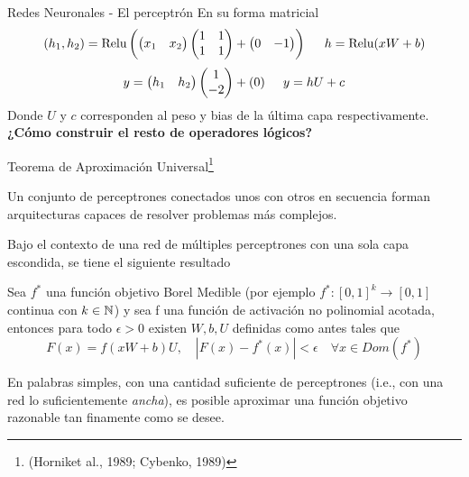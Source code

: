 \documentclass[handout, 9pt]{beamer}
\begin{document}
\begin{frame}{Redes Neuronales - El perceptrón}
En su forma matricial 
$$
(h_1 , h_2) = \text{Relu} \left ( \begin{pmatrix}
x_1 & x_2  
\end{pmatrix} \begin{pmatrix}
1 &1 \\ 
 1 & 1
\end{pmatrix} + \begin{pmatrix}
0 & -1 
\end{pmatrix}\right) \hspace{0.5cm} h = \text{Relu}(xW + b)
$$
\pause
$$
y = \begin{pmatrix}
h_1 & h_2 
\end{pmatrix}\begin{pmatrix}
1 \\ 
-2 
\end{pmatrix} + (0) \hspace{0.5cm} y = hU + c
$$
Donde $U$ y $c$ corresponden al peso y bias de la última capa respectivamente. 
\textbf{¿Cómo construir el resto de operadores lógicos?}
\end{frame}

\begin{frame}{Teorema de Aproximación Universal\footnote{(Horniket al., 1989; Cybenko, 1989)} }

Un conjunto de perceptrones conectados unos con otros en secuencia forman arquitecturas capaces de resolver problemas más complejos.  \pause

Bajo el contexto de una red de múltiples perceptrones con una sola capa escondida, se tiene el siguiente resultado \pause

\begin{theorem}

Sea $f^{*}$ una función objetivo Borel Medible (por ejemplo $f^{*}:[0,1]^k \rightarrow [0,1]$ continua con $k \in {\mathbb N}$) y sea f una función de activación no polinomial acotada, entonces para todo $\epsilon > 0$ existen $W,b,U$ definidas como antes tales que 
\[
F(x) = f(xW+b)U, \quad 
|F(x)-f^{*}(x)|<\epsilon \quad \forall x \in Dom(f^{*}) 
\]
\end{theorem} \pause
En palabras simples, con una cantidad suficiente de perceptrones (i.e., con una red lo suficientemente \emph{ancha}), es posible aproximar una función objetivo razonable tan finamente como se desee. 
\end{frame}
\end{document}
